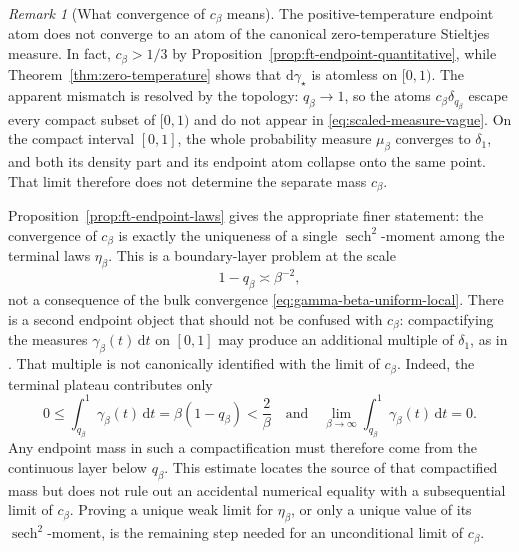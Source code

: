 \documentclass[10pt]{amsart}
\theoremstyle{definition}
\theoremstyle{remark}
\newtheorem{remark}[remark]{Remark}
\numberwithin{equation}{section}
\newcommand{\1}{\mathbf 1}
\newcommand{\sech}{\operatorname{sech}}
\newcommand{\dd}{\,\mathrm d}
\begin{document}
\begin{remark}[What convergence of $c_\beta$ means]
\label{rem:c-beta-convergence}
The positive-temperature endpoint atom does not converge to an atom of the canonical zero-temperature Stieltjes measure.  In fact, $c_\beta>1/3$ by Proposition~\ref{prop:ft-endpoint-quantitative}, while Theorem~\ref{thm:zero-temperature} shows that $\mathrm d\gamma_\star$ is atomless on $[0,1)$.  The apparent mismatch is resolved by the topology: $q_\beta\to1$, so the atoms $c_\beta\delta_{q_\beta}$ escape every compact subset of $[0,1)$ and do not appear in \eqref{eq:scaled-measure-vague}.  On the compact interval $[0,1]$, the whole probability measure $\mu_\beta$ converges to $\delta_1$, and both its density part and its endpoint atom collapse onto the same point.  That limit therefore does not determine the separate mass $c_\beta$.

Proposition~\ref{prop:ft-endpoint-laws} gives the appropriate finer statement: the convergence of $c_\beta$ is exactly the uniqueness of a single $\sech^2$-moment among the terminal laws $\eta_\beta$.  This is a boundary-layer problem at the scale
\begin{equation*}
 1-q_\beta\asymp\beta^{-2},
\end{equation*}
not a consequence of the bulk convergence \eqref{eq:gamma-beta-uniform-local}.  There is a second endpoint object that should not be confused with $c_\beta$: compactifying the measures $\gamma_\beta(t)\dd t$ on $[0,1]$ may produce an additional multiple of $\delta_1$, as in \cite[Lemma 3]{AuffingerChenGroundState}.  That multiple is not canonically identified with the limit of $c_\beta$. Indeed, the terminal plateau contributes only
\begin{equation*}
 0\leq\int_{q_\beta}^1\gamma_\beta(t)\dd t
 =\beta(1-q_\beta)<\frac2\beta
 \quad\text{and}\quad
 \lim_{\beta\to\infty}\int_{q_\beta}^1\gamma_\beta(t)\dd t=0.
\end{equation*}
Any endpoint mass in such a compactification must therefore come from the continuous layer below $q_\beta$.  This estimate locates the source of that compactified mass but does not rule out an accidental numerical equality with a subsequential limit of $c_\beta$.  Proving a unique weak limit for $\eta_\beta$, or only a unique value of its $\sech^2$-moment, is the remaining step needed for an unconditional limit of $c_\beta$.
\end{remark}
\fi

\appendix
\end{document}

